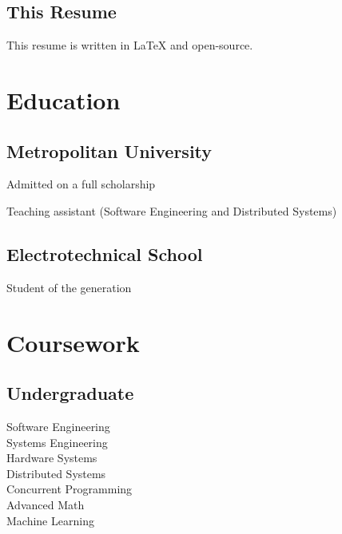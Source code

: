 \documentclass[]{matija-resume}
\begin{document}
\begin{minipage}[t]{0.33\textwidth}
\subsection{This Resume}
This resume is written in LaTeX and open-source.


\section{Education}

\subsection{Metropolitan University}
\vspace{\topsep}
\begin{tightemize}
\item Admitted on a full scholarship
\item Teaching assistant (Software Engineering and Distributed Systems)
\end{tightemize}
\sectionsep

\subsection{Electrotechnical School}
\vspace{\topsep}
\begin{tightemize}
\item Student of the generation
\end{tightemize}
\sectionsep


\section{Coursework}
\subsection{Undergraduate}
Software Engineering \\
Systems Engineering \\
Hardware Systems \\
Distributed Systems \\
Concurrent Programming \\
Advanced Math \\
Machine Learning \\
\sectionsep

%
%

\end{minipage}
\end{document}
